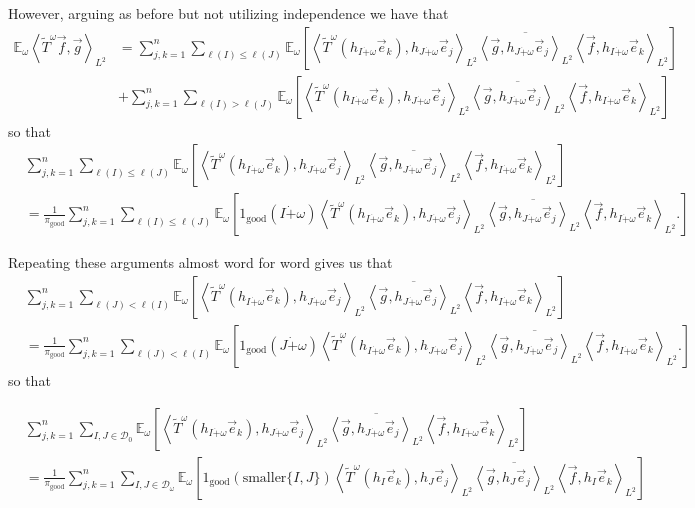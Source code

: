 \documentclass[12pt,reqno ]{amsart}
\numberwithin{equation}{section}
\theoremstyle{definition}
\newcommand{\Ew}{\ensuremath{\mathbb{E}_\omega}}
\newcommand{\D}{\ensuremath{\mathscr{D}}}
\newcommand{\V}[1]{\ensuremath{\vec{#1}}}
\newcommand{\ip}[2]{\ensuremath{\left\langle#1,#2\right\rangle}}
\newcommand{\T}[1]{\ensuremath{\text{#1}}}
\begin{document}
However, arguing as before but not utilizing independence we have that \begin{align*} \Ew  \ip{\widetilde{T}^\omega \vec{f}}{\vec{g}}_{L^2} & =  \sum_{j, k = 1}^n  \sum_{\ell(I) \leq \ell(J) }   \Ew   \left[\ip{\widetilde{T} ^\omega (h_{I \dot+ \omega} \V{e}_k )}{ h_{J \dot+ \omega} \V{e}_j}_{L^2} \overline{\ip{\vec{g}}{h_{J \dot+ \omega} \V{e}_j }_{L^2}}  \ip{\vec{f}}{ h_{I \dot +\omega} \V{e}_k}_{L^2}\right]  \\ & +   \sum_{j, k = 1}^n  \sum_{\ell(I) >  \ell(J) }   \Ew   \left[\ip{\widetilde{T} ^\omega (h_{I \dot+ \omega} \V{e}_k )}{ h_{J \dot+ \omega} \V{e}_j}_{L^2} \overline{\ip{\vec{g}}{h_{J \dot+ \omega} \V{e}_j }_{L^2}}  \ip{\vec{f}}{ h_{I \dot +\omega} \V{e}_k}_{L^2}\right] \end{align*} so that \begin{align*} & \sum_{j, k = 1}^n  \sum_{\ell(I) \leq \ell(J) }   \Ew   \left[\ip{\widetilde{T} ^\omega (h_{I \dot+ \omega} \V{e}_k )}{ h_{J \dot+ \omega} \V{e}_j}_{L^2} \overline{\ip{\vec{g}}{h_{J \dot+ \omega} \V{e}_j }_{L^2}}  \ip{\vec{f}}{ h_{I \dot +\omega} \V{e}_k}_{L^2}\right]  \\ &  = \frac{1}{\pi_{\text{good}}} \sum_{j, k = 1}^n  \sum_{\ell(I) \leq \ell(J) }   \Ew  \left[1_\text{good} (I \dot+ \omega) \ip{\widetilde{T} ^\omega (h_{I \dot+ \omega} \V{e}_k )}{ h_{J \dot+ \omega} \V{e}_j}_{L^2} \overline{\ip{\vec{g}}{h_{J \dot+ \omega} \V{e}_j }_{L^2}}  \ip{\vec{f}}{ h_{I \dot +\omega} \V{e}_k}_{L^2}.\right] \end{align*}

Repeating these arguments almost word for word gives us that \begin{align*} & \sum_{j, k = 1}^n  \sum_{\ell(J) < \ell(I) }   \Ew   \left[\ip{\widetilde{T} ^\omega (h_{I \dot+ \omega} \V{e}_k )}{ h_{J \dot+ \omega} \V{e}_j}_{L^2} \overline{\ip{\vec{g}}{h_{J \dot+ \omega} \V{e}_j }_{L^2}}  \ip{\vec{f}}{ h_{I \dot +\omega} \V{e}_k}_{L^2}\right]  \\ &  = \frac{1}{\pi_{\text{good}}} \sum_{j, k = 1}^n  \sum_{\ell(J) < \ell(I) }   \Ew  \left[1_\text{good} (J \dot+ \omega) \ip{\widetilde{T} ^\omega (h_{I \dot+ \omega} \V{e}_k )}{ h_{J \dot+ \omega} \V{e}_j}_{L^2} \overline{\ip{\vec{g}}{h_{J \dot+ \omega} \V{e}_j }_{L^2}}  \ip{\vec{f}}{ h_{I \dot +\omega} \V{e}_k}_{L^2}. \right] \end{align*} so that

\begin{align*}  & \sum_{j, k = 1}^n  \sum_{I, J \in \D_0 }   \Ew   \left[\ip{\widetilde{T} ^\omega (h_{I \dot+ \omega} \V{e}_k )}{ h_{J \dot+ \omega} \V{e}_j}_{L^2} \overline{\ip{\vec{g}}{h_{J \dot+ \omega} \V{e}_j }_{L^2}}  \ip{\vec{f}}{ h_{I \dot +\omega} \V{e}_k}_{L^2}\right] \\ & =  \frac{1}{\pi_{\text{good}}} \sum_{j, k = 1}^n  \sum_{I, J \in \D_\omega }   \Ew  \left[ 1_\text{good} ( \T{smaller} \{I , J \}) \ip{\widetilde{T} ^\omega (h_{I } \V{e}_k )}{ h_{J } \V{e}_j}_{L^2} \overline{\ip{\vec{g}}{h_{J } \V{e}_j }_{L^2}}  \ip{\vec{f}}{ h_{I } \V{e}_k}_{L^2} \right] \end{align*}
\end{document}
